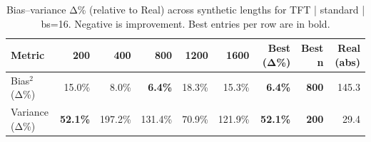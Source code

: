 \renewcommand{\arraystretch}{1.2}
\begin{table}[!t]
\centering
\footnotesize
\caption{Bias–variance Δ\% (relative to Real) across synthetic lengths for TFT | standard | bs=16. Negative is improvement. Best entries per row are in bold.}
\label{tab:bvdelta_TFT_standard_bs16}
\setlength{\tabcolsep}{5pt}
\begin{tabular}{lrrrrrrrr}
\toprule
Metric & 200 & 400 & 800 & 1200 & 1600 & Best (Δ\%) & Best n & Real (abs) \\
\midrule
Bias$^2$ (Δ\%) & 15.0\% & 8.0\% & \textbf{6.4\%} & 18.3\% & 15.3\% & \textbf{6.4\%} & \textbf{800} & 145.3 \\
Variance (Δ\%) & \textbf{52.1\%} & 197.2\% & 131.4\% & 70.9\% & 121.9\% & \textbf{52.1\%} & \textbf{200} & 29.4 \\
\bottomrule
\end{tabular}

\end{table}
